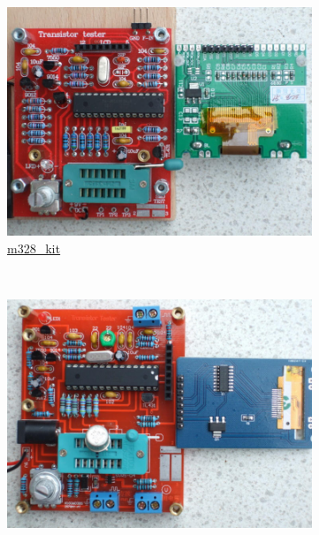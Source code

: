 \documentclass[pdftex,12pt,a4paper,english]{article}
\begin{document}
\vspace{-1em}
\begin{figure}[H]
  \begin{subfigure}[b]{.3\textwidth}
    \centering
    \includegraphics[width=1.\textwidth]{../PNG/Kit_ST7565b.jpg}
	  \\ \vspace{-0.5em}
	  {\href{run:./trunk/mega328_st7565_kit/.}{m328\_kit}}
  \end{subfigure}
~
  \begin{subfigure}[b]{.3\textwidth}	%
    \centering
    \includegraphics[width=1.\textwidth]{../PNG/Kit_Color_b.jpg}
	  \\ \vspace{-0.5em}

\end{subfigure}
\end{figure}
\end{document}
